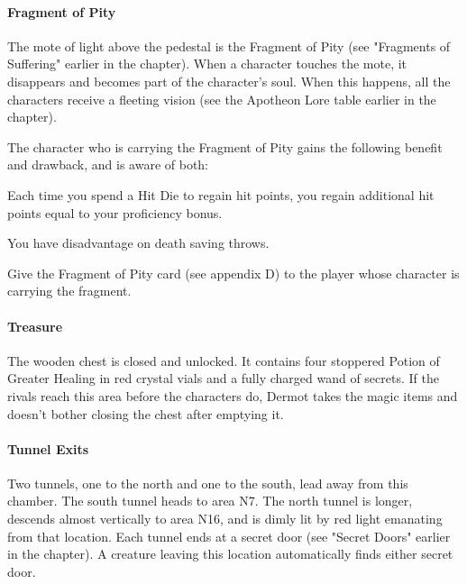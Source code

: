 \documentclass[10pt,a4paper,twoside,bg=print,twocolumn,openany,nodeprecatedcode]{dndbook}
\begin{document}
\paragraph{Fragment of Pity}
The mote of light above the pedestal is the Fragment of Pity (see "Fragments of Suffering" earlier in the chapter). When a character touches the mote, it disappears and becomes part of the character's soul. When this happens, all the characters receive a fleeting vision (see the Apotheon Lore table earlier in the chapter).

The character who is carrying the Fragment of Pity gains the following benefit and drawback, and is aware of both:

\begin{DndComment}{}

\begin{description}[nolistsep]
\item[Benefit.]
Each time you spend a Hit Die to regain hit points, you regain additional hit points equal to your proficiency bonus.
\item[Drawback.]
You have disadvantage on death saving throws.
\end{description}

\end{DndComment}

Give the Fragment of Pity card (see appendix D) to the player whose character is carrying the fragment.

\paragraph{Treasure}
The wooden chest is closed and unlocked. It contains four stoppered Potion of Greater Healing in red crystal vials and a fully charged wand of secrets. If the rivals reach this area before the characters do, Dermot takes the magic items and doesn't bother closing the chest after emptying it.

\paragraph{Tunnel Exits}
Two tunnels, one to the north and one to the south, lead away from this chamber. The south tunnel heads to area N7. The north tunnel is longer, descends almost vertically to area N16, and is dimly lit by red light emanating from that location. Each tunnel ends at a secret door (see "Secret Doors" earlier in the chapter). A creature leaving this location automatically finds either secret door.
\end{document}
